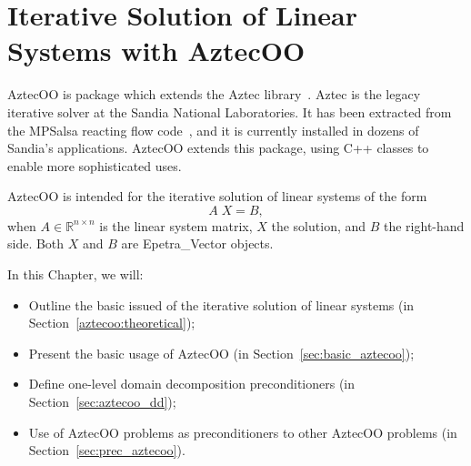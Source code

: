 % 
% 
% 
%  
%  
% 

\section{Iterative Solution of Linear Systems with AztecOO}
\label{chap:aztecoo}

AztecOO is package which extends the Aztec library~\cite{Aztec2.1}.
Aztec is the legacy iterative solver at the Sandia National
Laboratories.  It has been extracted from the MPSalsa reacting flow
code~\cite{MPSalsa-Theory,MPSalsa-User-Guide}, and it is currently
installed in dozens of Sandia's applications. AztecOO extends this
package, using C++ classes to enable more sophisticated uses.

AztecOO is intended for the iterative solution of linear systems of the
form
\begin{equation}
  \label{eq:linear_sys}
  A \; X = B ,
\end{equation}
when $A \in \mathbb{R}^{n \times n}$ is the linear system matrix, $X$
the solution, and $B$ the right-hand side. Both $X$ and $B$ are
Epetra\_Vector objects.

In this Chapter, we  will:
\begin{itemize}
\item Outline the basic issued of the iterative solution of linear
  systems (in Section~\ref{aztecoo:theoretical});
\item Present the basic usage of AztecOO (in
  Section~\ref{sec:basic_aztecoo});
\item Define one-level domain decomposition preconditioners (in
  Section~\ref{sec:aztecoo_dd});
\item Use of AztecOO problems as preconditioners to other AztecOO
  problems (in Section~\ref{sec:prec_aztecoo}).
\end{itemize}

